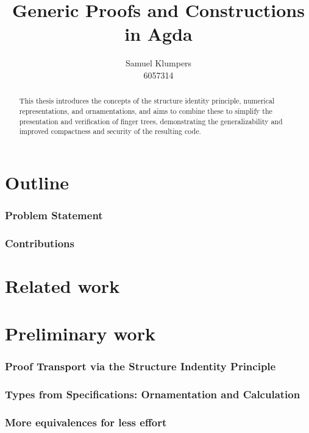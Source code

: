 \documentclass{article}
\title{Generic Proofs and Constructions in Agda}
\author{Samuel Klumpers\\6057314}
\theoremstyle{plain}%
\theoremstyle{definition}
\begin{document}
\maketitle
\tableofcontents

\newpage

\begin{abstract} %
    This thesis introduces the concepts of the structure identity principle, numerical representations, and ornamentations, and aims to combine these to simplify the presentation and verification of finger trees, demonstrating the generalizability and improved compactness and security of the resulting code. 
\end{abstract}

\part{Outline}
\section{Problem Statement}

\section{Contributions}


\part{Related work}

\part{Preliminary work}


\section{Proof Transport via the Structure Indentity Principle}\label{sec:leibniz}


\section{Types from Specifications: Ornamentation and Calculation}\label{sec:numrep}


\section{More equivalences for less effort}\label{sec:userfriendly}

\end{document}
